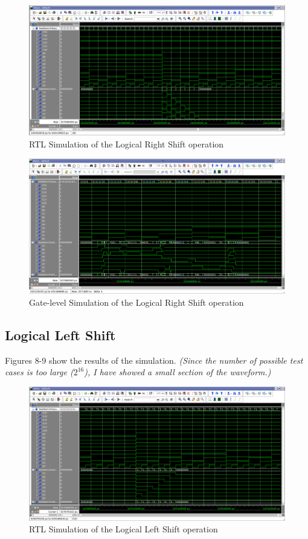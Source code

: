 \documentclass[a4paper, 11pt]{article}
\begin{document}
\begin{figure}[h]
\centering
\includegraphics[scale=0.33]{rightshift_RTL}
\caption{RTL Simulation of the Logical Right Shift operation}
\end{figure}

\begin{figure}[h]
\centering
\includegraphics[scale=0.33]{rightshift_Gate}
\caption{Gate-level Simulation of the Logical Right Shift operation}
\end{figure}

\subsection{Logical Left Shift}
Figures 8-9 show the results of the simulation. \emph{(Since the number of possible test cases is too large ($2^{16}$), I have showed a small section of the waveform.)}

\begin{figure}[h]
\centering
\includegraphics[scale=0.33]{leftshift_RTL}
\caption{RTL Simulation of the Logical Left Shift operation}
\end{figure}
\end{document}
